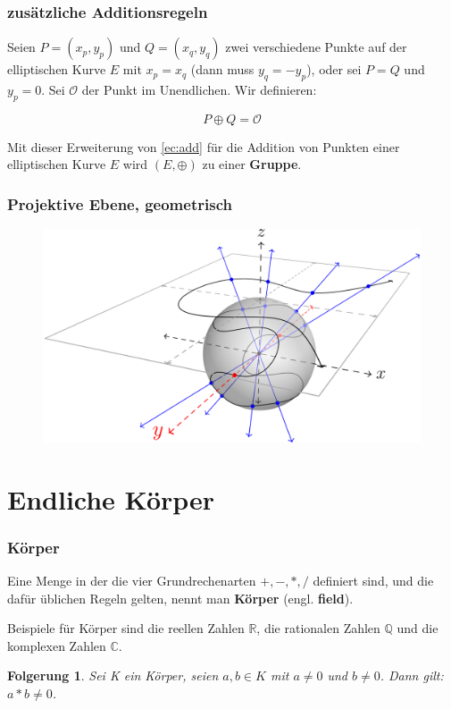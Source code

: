 \documentclass{beamer}
\newcommand{\Q}{\mathbb{Q}}
\newcommand{\R}{\mathbb{R}}
\newtheorem{folgerung}[theorem]{Folgerung}
\begin{document}
\begin{frame}
  \frametitle{zusätzliche Additionsregeln}
  \begin{definition}
    Seien $P = (x_p, y_p)$ und $Q =(x_q, y_q)$ zwei verschiedene Punkte auf der
    elliptischen Kurve $E$ mit $x_p = x_q$ (dann muss $y_q = -y_p$),
    oder sei $P = Q$ und $y_p = 0$.
    Sei $\mathcal{O}$ der Punkt im Unendlichen. Wir definieren:

    $$ P \oplus Q = \mathcal{O} $$
  \end{definition}
  \begin{Theorem}
    Mit dieser Erweiterung von \eqref{ec:add} für die Addition von Punkten einer
    elliptischen Kurve $E$ wird $(E, \oplus)$ zu einer {\bf Gruppe}.
  \end{Theorem}
\end{frame}

\begin{frame}
  \frametitle{Projektive Ebene, geometrisch}
  \begin{figure}
    \includegraphics[height=0.57\textwidth]{ell-curve-projective.png}
  \end{figure}
\end{frame}


\section{Endliche Körper}

\begin{frame}
  \frametitle{Körper}
  \begin{definition}
    Eine Menge in der die vier Grundrechenarten $+, -, *, /$ definiert sind,
    und die dafür üblichen Regeln gelten, nennt man {\bf Körper}
    (engl. {\bf field}).
  \end{definition}

  \pause
  Beispiele für Körper sind die reellen Zahlen $\R$, die rationalen
  Zahlen $\Q$ und die komplexen Zahlen $\mathbb{C}$.

  \pause
  \begin{folgerung}
    Sei K ein Körper, seien $a, b \in K$ mit $a \ne 0$ und $b \ne 0$.  Dann
    gilt: $a * b \ne 0$.
  \end{folgerung}
\end{frame}
\end{document}
